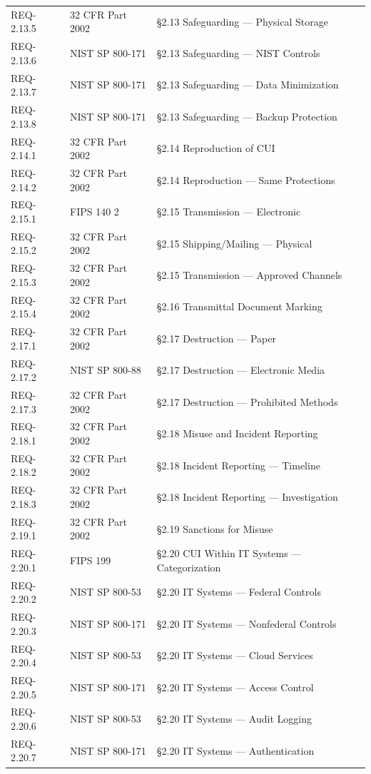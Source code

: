 \documentclass[11pt,letterpaper]{article}
\begin{document}
\begin{longtable}{@{}l l p{8cm}@{}}
REQ-2.13.5 & 32 CFR Part 2002 & \S2.13 Safeguarding --- Physical Storage \\
REQ-2.13.6 & NIST SP 800-171 & \S2.13 Safeguarding --- NIST Controls \\
REQ-2.13.7 & NIST SP 800-171 & \S2.13 Safeguarding --- Data Minimization \\
REQ-2.13.8 & NIST SP 800-171 & \S2.13 Safeguarding --- Backup Protection \\
REQ-2.14.1 & 32 CFR Part 2002 & \S2.14 Reproduction of CUI \\
REQ-2.14.2 & 32 CFR Part 2002 & \S2.14 Reproduction --- Same Protections \\
REQ-2.15.1 & FIPS 140 2 & \S2.15 Transmission --- Electronic \\
REQ-2.15.2 & 32 CFR Part 2002 & \S2.15 Shipping/Mailing --- Physical \\
REQ-2.15.3 & 32 CFR Part 2002 & \S2.15 Transmission --- Approved Channels \\
REQ-2.15.4 & 32 CFR Part 2002 & \S2.16 Transmittal Document Marking \\
REQ-2.17.1 & 32 CFR Part 2002 & \S2.17 Destruction --- Paper \\
REQ-2.17.2 & NIST SP 800-88 & \S2.17 Destruction --- Electronic Media \\
REQ-2.17.3 & 32 CFR Part 2002 & \S2.17 Destruction --- Prohibited Methods \\
REQ-2.18.1 & 32 CFR Part 2002 & \S2.18 Misuse and Incident Reporting \\
REQ-2.18.2 & 32 CFR Part 2002 & \S2.18 Incident Reporting --- Timeline \\
REQ-2.18.3 & 32 CFR Part 2002 & \S2.18 Incident Reporting --- Investigation \\
REQ-2.19.1 & 32 CFR Part 2002 & \S2.19 Sanctions for Misuse \\
REQ-2.20.1 & FIPS 199 & \S2.20 CUI Within IT Systems --- Categorization \\
REQ-2.20.2 & NIST SP 800-53 & \S2.20 IT Systems --- Federal Controls \\
REQ-2.20.3 & NIST SP 800-171 & \S2.20 IT Systems --- Nonfederal Controls \\
REQ-2.20.4 & NIST SP 800-53 & \S2.20 IT Systems --- Cloud Services \\
REQ-2.20.5 & NIST SP 800-171 & \S2.20 IT Systems --- Access Control \\
REQ-2.20.6 & NIST SP 800-53 & \S2.20 IT Systems --- Audit Logging \\
REQ-2.20.7 & NIST SP 800-171 & \S2.20 IT Systems --- Authentication \\

\end{longtable}
\end{document}
